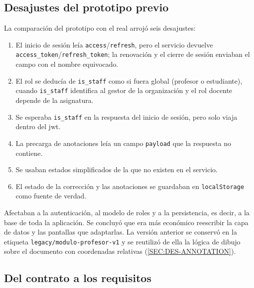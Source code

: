 \subsection{Desajustes del prototipo previo}

La comparación del prototipo con el  real arrojó seis desajustes:
\begin{enumerate}
  \item El inicio de sesión leía \texttt{access}/\texttt{refresh}, pero el servicio devuelve
        \texttt{access\_token}/\texttt{refresh\_token}; la renovación y el cierre de sesión
        enviaban el campo con el nombre equivocado.
  \item El rol se deducía de \texttt{is\_staff} como si fuera global (profesor o estudiante),
        cuando \texttt{is\_staff} identifica al gestor de la organización y el rol docente
        depende de la asignatura.
  \item Se esperaba \texttt{is\_staff} en la respuesta del inicio de sesión, pero solo
        viaja dentro del \acs{jwt}.
  \item La precarga de anotaciones leía un campo \texttt{payload} que la respuesta no
        contiene.
  \item Se usaban estados simplificados de la  que no existen en el servicio.
  \item El estado de la corrección y las anotaciones se guardaban en
        \texttt{localStorage} como fuente de verdad.
\end{enumerate}
Afectaban a la autenticación, al modelo de roles y a la persistencia, es decir, a la base de
toda la aplicación. Se concluyó que era más económico reescribir la capa de datos y las
pantallas que adaptarlas. La versión anterior se conservó en la etiqueta
\texttt{legacy/modulo-profesor-v1} y se reutilizó de ella la lógica de dibujo sobre el
documento con coordenadas relativas (\cref{SEC:DES-ANNOTATION}).

\subsection{Del contrato a los requisitos}

